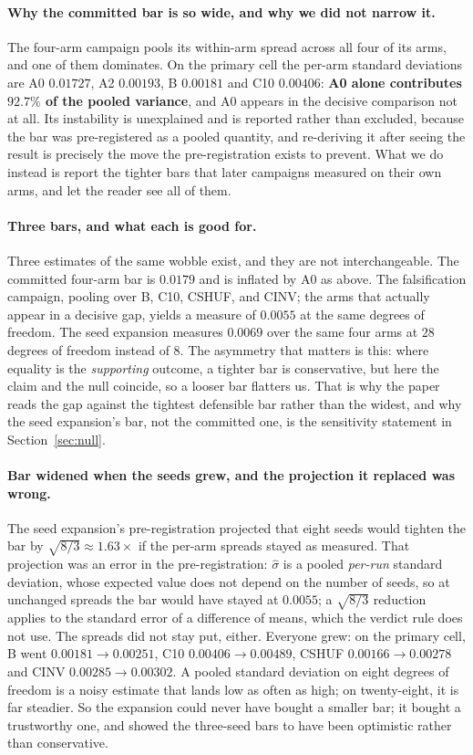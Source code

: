 \documentclass{article}
\begin{document}
\paragraph{Why the committed bar is so wide, and why we did not narrow it.} The four-arm campaign
pools its within-arm spread across all four of its arms, and one of them dominates. On the primary
cell the per-arm standard deviations are A0 $0.01727$, A2 $0.00193$, B $0.00181$ and C10 $0.00406$:
\textbf{A0 alone contributes $92.7\%$ of the pooled variance}, and A0 appears in the decisive
comparison not at all. Its instability is unexplained and is reported rather than excluded, because
the bar was pre-registered as a pooled quantity, and re-deriving it after seeing the result is
precisely the move the pre-registration exists to prevent. What we do instead is report the tighter
bars that later campaigns measured on their own arms, and let the reader see all of them.

\paragraph{Three bars, and what each is good for.} Three estimates of the same wobble exist,
and they are not interchangeable. The committed four-arm bar is $0.0179$ and is inflated by A0 as
above. The falsification campaign, pooling over B, C10, CSHUF, and CINV; the arms that actually appear in a decisive gap, yields a measure of $0.0055$ at the same degrees of freedom. The seed expansion
measures $0.0069$ over the same four arms at $28$ degrees of freedom instead of $8$. The asymmetry
that matters is this: where equality is the \emph{supporting} outcome, a tighter bar is
conservative, but here the claim and the null coincide, so a looser bar flatters us. That is why the
paper reads the gap against the tightest defensible bar rather than the widest, and why the seed
expansion's bar, not the committed one, is the sensitivity statement in Section~\ref{sec:null}.

\paragraph{Bar widened when the seeds grew, and the projection it replaced was wrong.} The seed
expansion's pre-registration projected that eight seeds would tighten the bar by
$\sqrt{8/3} \approx 1.63\times$ if the per-arm spreads stayed as measured. That projection was an
error in the pre-registration: $\hat{\sigma}$ is a pooled \emph{per-run} standard deviation, whose
expected value does not depend on the number of seeds, so at unchanged spreads the bar would have
stayed at $0.0055$; a $\sqrt{8/3}$ reduction applies to the standard error of a difference of means,
which the verdict rule does not use. The spreads did not stay put, either. Everyone grew: on the primary cell, B went $0.00181 \rightarrow 0.00251$, C10 $0.00406 \rightarrow 0.00489$, CSHUF
$0.00166 \rightarrow 0.00278$ and CINV $0.00285 \rightarrow 0.00302$. A pooled standard deviation
on eight degrees of freedom is a noisy estimate that lands low as often as high; on twenty-eight, it
is far steadier. So the expansion could never have bought a smaller bar; it bought a trustworthy
one, and showed the three-seed bars to have been optimistic rather than conservative.
\end{document}
